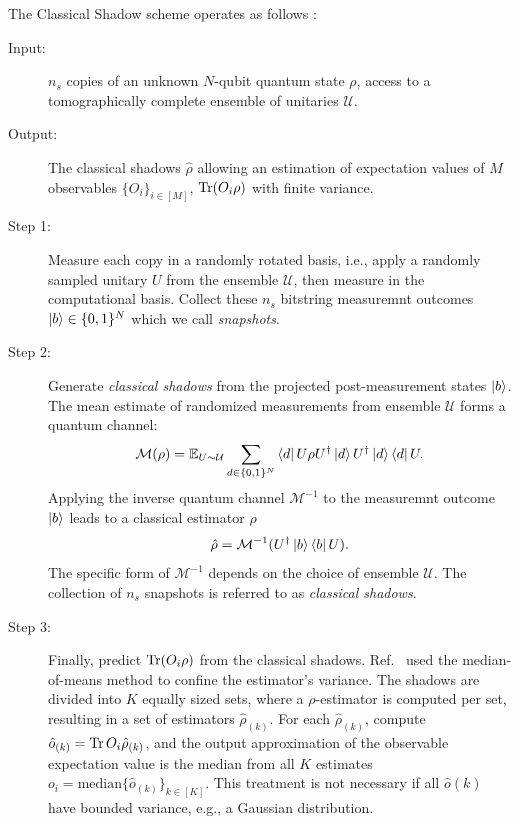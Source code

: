 \documentclass[../main.tex]{subfiles}
\begin{document}
The Classical Shadow scheme operates as follows \cite{huang2020predicting}:
\begin{description}
    \item[Input:] $n_s$ copies of an unknown $N$-qubit quantum state $\rho$, access to a tomographically complete ensemble of unitaries $\mathcal{U}$.
    \item[Output:] The classical shadows $\hat{\rho}$ allowing an estimation of expectation values of $M$ observables $\{O_i\}_{i\in [M]}$, $\Tr (O_i \rho)$ with finite variance.
    \item[Step 1:] Measure each copy in a randomly rotated basis, i.e., apply a randomly sampled unitary $U$ from the ensemble $\mathcal{U}$, then measure in the computational basis. Collect these $n_s$ bitstring measuremnt outcomes $\ket{b} \in \{0,1\}^N$ which we call \textit{snapshots}.
    \item[Step 2:] Generate \textit{classical shadows} from the projected post-measurement states $\ket{b}$. The mean estimate of randomized measurements from ensemble $\mathcal{U}$ forms a quantum channel:
    \begin{equation}
        \mathcal{M}(\rho) = \mathbb{E}_{U \sim \mathcal{U}} \sum_{d \in \{0,1\}^N} \bra{d} U \rho U^\dagger \ket{d} U^\dagger \ket{d}\bra{d}U.
    \end{equation} Applying the inverse quantum channel  $\mathcal{M}^{-1}$ to the measuremnt outcome $\ket{b}$ leads to a classical estimator $\hat{\rho}$
    \begin{equation}
        \hat{\rho} = \mathcal{M}^{-1} (U^\dagger \ket{b}\bra{b}U).
    \end{equation}
    The specific form of $\mathcal{M}^{-1}$ depends on the choice of ensemble $\mathcal{U}$. The collection of $n_s$ snapshots is referred to as \textit{classical shadows}.
    \item[Step 3:] Finally, predict $\Tr (O_i \rho)$ from the classical shadows. Ref.~\cite{huang2020predicting} used the median-of-means method to confine the estimator's variance. The shadows are divided into  $K$ equally sized sets, where a $\rho$-estimator is computed per set, resulting in a set of estimators  $\hat{\rho}_{(k)}$. For each $\hat{\rho}_{(k)}$, compute $\hat{o}_{(k)}= \Tr O_i \hat{\rho}_{(k)}$, and the output approximation of the observable expectation value is the median from all $K$ estimates $o_i = \mathrm{median} \{\hat{o}_{(k)}\}_{k \in [K]}$.  This treatment is not necessary if all $\hat{o}{(k)}$ have bounded variance, e.g., a Gaussian distribution.
\end{description}
\end{document}
